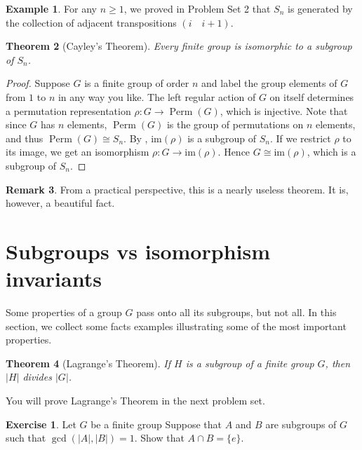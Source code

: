 \documentclass[12pt]{report}
\newtheorem{theorem}{Theorem}[chapter]
\numberwithin{equation}{section}
\numberwithin{theorem}{chapter}
\theoremstyle{definition}
\newtheorem{example}[theorem]{Example}
\newtheorem{exercise}{Exercise}
\newtheorem*{basic properties}{Basic Properties}
\newtheorem*{Important Remark}{Important Remark}
\newtheorem{remark}[theorem]{Remark}
\DeclareMathOperator{\Perm}{Perm}
\begin{document}
\begin{example} 
For any $n \geqslant 1$, we proved in Problem Set 2 that $S_n$ is generated by the collection of adjacent transpositions $(i \quad i+1)$.	
\end{example}



\begin{theorem}[Cayley's Theorem]
Every finite group is isomorphic to a subgroup of $S_n$. 
\end{theorem}

\begin{proof} 
Suppose $G$ is a finite group of order $n$ and label the group elements of $G$ from $1$ to $n$ in any way you like. The left regular action of $G$ on itself determines a permutation representation $\rho\!:G\to \Perm(G)$, which is injective. Note that since $G$ has $n$ elements, $\Perm(G)$ is the group of permutations on $n$ elements, and thus $\Perm(G) \cong S_n$. By , $\mathrm{im}(\rho)$ is a subgroup of $S_n$. If we restrict $\rho$ to its image, we get an isomorphism $\rho\!: G \to \mathrm{im}(\rho)$. Hence $G\cong \mathrm{im}(\rho)$, which is a subgroup of $S_n$. 
\end{proof}

\begin{remark}
From a practical perspective, this is a nearly useless theorem. It is, however, a beautiful fact.	
\end{remark}



\section{Subgroups vs isomorphism invariants}

Some properties of a group $G$ pass onto all its subgroups, but not all. In this section, we collect some facts examples illustrating some of the most important properties.



\begin{theorem}[Lagrange's Theorem]\label{Lagrange}
If $H$ is a subgroup of a finite group $G$, then $|H|$ divides $|G|$.
\end{theorem}

You will prove Lagrange's Theorem in the next problem set.


\begin{exercise}\label{intersection coprime subgroups is e}
	Let $G$ be a finite group Suppose that $A$ and $B$ are subgroups of $G$ such that $\gcd(|A|, |B|) = 1$. Show that $A \cap B = \{ e \}$.
\end{exercise}
\end{document}

